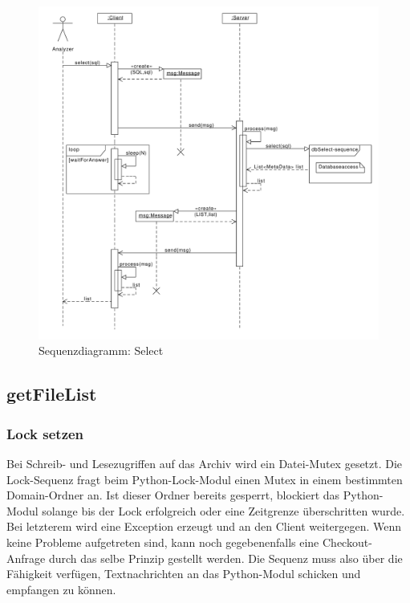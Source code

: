 \begin{figure}[h]
	\centering
	\label{dia:design:frontend:sqc:select}
	\includegraphics[width=\textwidth]{design/frontend/sequence/select-sequence.pdf}
	\caption{Sequenzdiagramm: Select}
\end{figure}

\subsection {getFileList}


\subsubsection{Lock setzen}

Bei Schreib- und Lesezugriffen auf das Archiv wird ein Datei-Mutex gesetzt.
Die Lock-Sequenz fragt beim Python-Lock-Modul einen Mutex in einem bestimmten Domain-Ordner an.
Ist dieser Ordner bereits gesperrt, blockiert das Python-Modul solange bis der Lock erfolgreich oder eine Zeitgrenze überschritten wurde.
Bei letzterem wird eine Exception erzeugt und an den Client weitergegen.
Wenn keine Probleme aufgetreten sind, kann noch gegebenenfalls eine Checkout-Anfrage durch das selbe Prinzip gestellt werden.
Die Sequenz muss also über die Fähigkeit verfügen, Textnachrichten an das Python-Modul schicken und empfangen zu können.

